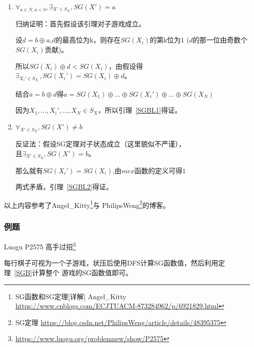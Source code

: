 \begin{enumerate}
	\item
	      \begin{lemma}\label{SGBL1}
		      $\forall_{a\in N,a<b},\exists_{X'\in S_X},SG(X')=a$
	      \end{lemma}

	      归纳证明：首先假设该引理对子游戏成立。

	      设$d=b\oplus a$,$d$的最高位为k，则存在$SG(X_i)$的第k位为1
	      ($d$的那一位由奇数个$SG(X_i)$贡献)。

	      所以$SG(X_i)\oplus d<SG(X_i)$，由假设得$\exists_{X_i'\in
			      S_{X_i}},SG(X_i')=SG(X_i)\oplus d$。

	      结合$a=b\oplus d$得$a=SG(X_1)\oplus \ldots \oplus SG(X_i')
		      \oplus \ldots \oplus SG(X_N)$

	      因为$X_1,\ldots,X_i',\ldots,X_N\in S_X$，所以引理~\ref{SGBL1}得证。

	\item
	      \begin{lemma}\label{SGBL2}
		      $\forall_{X'\in S_X},SG(X')\not=b$
	      \end{lemma}

	      反证法：假设SG定理对子状态成立（这里貌似不严谨），\\且$\exists_{X' \in S_X},SG(X')=b$。

	      那么就有$SG(X_i')=SG(X_i)$,由$mex$函数的定义可得$1$

	      两式矛盾，引理~\ref{SGBL2}得证。

\end{enumerate}

以上内容参考了Angel\_Kitty\footnote{SG函数和SG定理[详解] Angel\_Kitty
\url{https://www.cnblogs.com/ECJTUACM-873284962/p/6921829.html}}与
PhilipsWeng\footnote{SG定理
	\url{https://blog.csdn.net/PhilipsWeng/article/details/48395375}}的博客。

\subsubsection{例题}

Luogu P2575 高手过招\footnote{\url{https://www.luogu.org/problemnew/show/P2575}}

每行棋子可视为一个子游戏，状压后使用DFS计算SG函数值，然后利用定理~\ref{SGB}计算整个
游戏的SG函数值即可。


